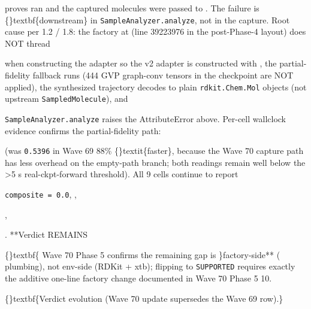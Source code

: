 \documentclass{article}
\begin{document}
 proves  ran and the captured molecules were passed to . The failure is \{\}textbf\{downstream\} in \texttt{SampleAnalyzer.analyze}, not in the capture. Root cause per  1.2 / 1.8: the factory at  (line 39223976 in the post-Phase-4 layout) does NOT thread

 when constructing the adapter  so the v2 adapter is constructed with , the partial-fidelity fallback runs (444 GVP graph-conv tensors in the checkpoint are NOT applied), the synthesized trajectory decodes to plain \texttt{rdkit.Chem.Mol} objects (not upstream \texttt{SampledMolecule}), and

\texttt{SampleAnalyzer.analyze} raises the AttributeError above. Per-cell wallclock evidence confirms the partial-fidelity path:

 (was \texttt{0.5396} in Wave 69  88\% \{\}textit\{faster\}, because the Wave 70 capture path has less overhead on the empty-path branch; both readings remain well below the >5 s real-ckpt-forward threshold). All 9 cells continue to report

\texttt{composite = 0.0}, ,

,

. **Verdict REMAINS

\{\}textbf\{  Wave 70 Phase 5 confirms the remaining gap is \}factory-side** ( plumbing), not env-side (RDKit + xtb); flipping to \texttt{SUPPORTED} requires exactly the additive one-line factory change documented in Wave 70 Phase 5 10.

\{\}textbf\{Verdict evolution (Wave 70 update  supersedes the Wave 69 row).\}
\end{document}
